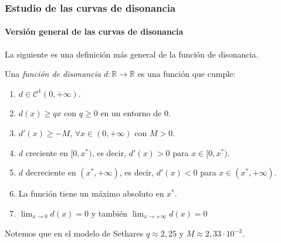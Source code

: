 \documentclass[12 pt]{beamer}
\begin{document}
\begin{frame}{22}
    \frametitle{Estudio de las curvas de disonancia}
    
    \framesubtitle{Versión general de las curvas de disonancia}
    
    La siguiente es una definición más general de la función de disonancia.
    
    \begin{alertblock}{}
    Una \emph{función de disonancia} $d: \mathbb{R} \rightarrow \mathbb{R}$ es una función que cumple:
    
    \begin{enumerate}    
        \item $d \in \mathcal{C}^{1} (0, + \infty)$.
        \item $d(x) \geq q x $ con $q \geq 0$ en un entorno de $0$.
        \item $d'(x) \geq  -M$, $\forall x \in (0, + \infty)$ con $M > 0$.
        \item $d$ creciente en $ [0, x^{*})$, es decir, $d'(x) > 0$ para $x \in  [0, x^{*})$.
        \item $d$ decreciente en $(x^{*}, + \infty )$, es decir, $d'(x) < 0$ para $x \in (x^{*}, + \infty )$.
        \item La función tiene un máximo absoluto en $x^*$.
        \item $\lim_{x \rightarrow 0} d(x) = 0$ y también $\lim_{x \rightarrow +\infty} d(x) = 0$ 
    \end{enumerate}
    
    \end{alertblock}
    
    Notemos que en el modelo de Sethares $q\approx2,25$ y $M\approx2,33 \cdot10^{-3}$.
\end{frame}
\end{document}
